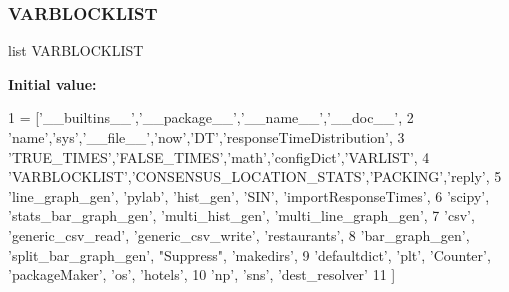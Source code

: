 \subsubsection{\texorpdfstring{V\+A\+R\+B\+L\+O\+C\+K\+L\+I\+ST}{VARBLOCKLIST}}
{\footnotesize\ttfamily list V\+A\+R\+B\+L\+O\+C\+K\+L\+I\+ST}

{\bfseries Initial value\+:}
\begin{DoxyCode}
1 =  [\textcolor{stringliteral}{'\_\_builtins\_\_'},\textcolor{stringliteral}{'\_\_package\_\_'},\textcolor{stringliteral}{'\_\_name\_\_'},\textcolor{stringliteral}{'\_\_doc\_\_'},
2                 \textcolor{stringliteral}{'name'},\textcolor{stringliteral}{'sys'},\textcolor{stringliteral}{'\_\_file\_\_'},\textcolor{stringliteral}{'now'},\textcolor{stringliteral}{'DT'},\textcolor{stringliteral}{'responseTimeDistribution'},
3                 \textcolor{stringliteral}{'TRUE\_TIMES'},\textcolor{stringliteral}{'FALSE\_TIMES'},\textcolor{stringliteral}{'math'},\textcolor{stringliteral}{'configDict'},\textcolor{stringliteral}{'VARLIST'},
4                 \textcolor{stringliteral}{'VARBLOCKLIST'},\textcolor{stringliteral}{'CONSENSUS\_LOCATION\_STATS'},\textcolor{stringliteral}{'PACKING'},\textcolor{stringliteral}{'reply'},
5                 \textcolor{stringliteral}{'line\_graph\_gen'}, \textcolor{stringliteral}{'pylab'}, \textcolor{stringliteral}{'hist\_gen'}, \textcolor{stringliteral}{'SIN'}, \textcolor{stringliteral}{'importResponseTimes'},
6                 \textcolor{stringliteral}{'scipy'}, \textcolor{stringliteral}{'stats\_bar\_graph\_gen'}, \textcolor{stringliteral}{'multi\_hist\_gen'}, \textcolor{stringliteral}{'multi\_line\_graph\_gen'},
7                 \textcolor{stringliteral}{'csv'}, \textcolor{stringliteral}{'generic\_csv\_read'}, \textcolor{stringliteral}{'generic\_csv\_write'}, \textcolor{stringliteral}{'restaurants'},
8                 \textcolor{stringliteral}{'bar\_graph\_gen'}, \textcolor{stringliteral}{'split\_bar\_graph\_gen'}, \textcolor{stringliteral}{"Suppress"}, \textcolor{stringliteral}{'makedirs'},
9                 \textcolor{stringliteral}{'defaultdict'}, \textcolor{stringliteral}{'plt'}, \textcolor{stringliteral}{'Counter'}, \textcolor{stringliteral}{'packageMaker'}, \textcolor{stringliteral}{'os'}, \textcolor{stringliteral}{'hotels'},
10                 \textcolor{stringliteral}{'np'}, \textcolor{stringliteral}{'sns'}, \textcolor{stringliteral}{'dest\_resolver'}
11                 ]
\end{DoxyCode}
\mbox{\label{namespacedynamicfilterapp_1_1toggles_abad4087652ccca08b33c499c7aad17b0}} 
